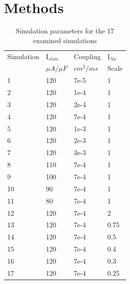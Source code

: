 \documentclass[12pt]{article}
\begin{document}
\section{Methods}
\begin{table}
	
	\centering
	\caption{Simulation parameters for the 17 examined simulations}
	\begin{tabular}{|l|l|l|l|}
		\hline
		Simulation & I$_{stim}$& Coupling & I$_{Na}$  \\ 
		&    $\mu A/\mu F$   & $cm^2/ms$         & Scale     \\ \hline
		1          & 120   & 7e-5     & 1    \\ \hline
		2          & 120   & 1e-4     & 1    \\ \hline
		3          & 120   & 2e-4     & 1    \\ \hline
		4          & 120   & 7e-4     & 1    \\ \hline
		5          & 120   & 1e-3     & 1    \\ \hline
		6          & 120   & 2e-3     & 1    \\ \hline
		7          & 120   & 3e-3     & 1    \\ \hline
		8          & 110   & 7e-4     & 1    \\ \hline
		9          & 100   & 7e-4     & 1    \\ \hline
		10         & 90    & 7e-4     & 1    \\ \hline
		11         & 80    & 7e-4     & 1    \\ \hline
		12         & 120   & 7e-4     & 2    \\ \hline
		13         & 120   & 7e-4     & 0.75 \\ \hline
		14         & 120   & 7e-4     & 0.5  \\ \hline
		15         & 120   & 7e-4     & 0.4  \\ \hline
		16         & 120   & 7e-4     & 0.3  \\ \hline
		17         & 120   & 7e-4     & 0.25 \\ \hline
	\end{tabular}
\label{tab:params}
\end{table}
\end{document}
